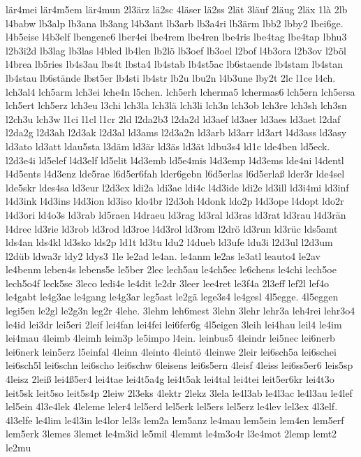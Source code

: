 {lär4mei
lär4m5em
lär4mun
2l3ärz
lä2sc
4läser
lä2ss
2lät
3läuf
2läug
2läx
1là
2lb
l4babw
lb3alp
lb3ana
lb3ang
l4b3ant
lb3arb
lb3a4ri
lb3ärm
lbb2
lbby2
lbei6ge.
l4b5eise
l4b3elf
lbengene6
lber4ei
lbe4rem
lbe4ren
lbe4ris
lbe4tag
lbe4tap
lbhu3
l2b3i2d
lb3lag
lb3las
l4bled
lb4len
lb2lö
lb3oef
lb3oel
l2bof
l4b3ora
l2b3ov
l2böl
l4brea
lb5ries
lb4s3au
lbs4t
lbsta4
lb4stab
lb4st5ac
lb6staende
lb4stam
lb4stan
lb4stau
lb6stände
lbst5er
lb4sti
lb4str
lb2u
lbu2n
l4b3une
lby2t
2lc
l1ce
l4ch.
lch3al4
lch5arm
lch3ei
lche4n
l5chen.
lch5erh
lcherma5
lchermas6
lch5ern
lch5ersa
lch5ert
lch5erz
lch3eu
l3chi
lch3la
lch3lä
lch3li
lch3n
lch3ob
lch3re
lch3sh
lch3sn
l2ch3u
lch3w
l1ci
l1cl
l1cr
2ld
l2da2b3
l2da2d
ld3aef
ld3aer
ld3aes
ld3aet
l2daf
l2da2g
l2d3ah
l2d3ak
l2d3al
ld3ams
l2d3a2n
ld3arb
ld3arr
ld3art
l4d3ass
ld3asy
ld3ato
ld3att
ldau5sta
l3däm
ld3är
ld3äs
ld3ät
ldbu3s4
ld1c
lde4ben
ld5eck.
l2d3e4i
ld5elef
l4d3elf
ld5elit
l4d3emb
ld5e4mis
l4d3emp
l4d3ems
lde4ni
l4dentl
l4d5ents
l4d3enz
lde5rae
l6d5er6fah
lder6gebn
l6d5erlas
l6d5erlaß
lder3r
lde4sel
lde5skr
ldes4sa
ld3eur
l2d3ex
ldi2a
ldi3ae
ldi4c
l4d3ide
ldi2e
ld3ill
ld3i4mi
ld3inf
l4d3ink
l4d3ins
l4d3ion
ld3iso
ldo4br
l2d3oh
l4donk
ldo2p
l4d3ope
l4dopt
ldo2r
l4d3ori
ld4o3s
ld3rab
ld5raen
l4draeu
ld3rag
ld3ral
ld3ras
ld3rat
ld3rau
l4d3rän
l4drec
ld3rie
ld3rob
ld3rod
ld3roe
l4d3rol
ld3rom
l2drö
ld3run
ld3rüc
lds5amt
lds4an
lds4kl
ld3sko
lds2p
ld1t
ld3tu
ldu2
l4dueb
ld3ufe
ldu3i
l2d3ul
l2d3um
l2düb
ldwa3r
ldy2
ldys3
1le
le2ad
le4an.
le4anm
le2as
le3atl
leauto4
le2av
le4benm
leben4s
lebens5e
le5ber
2lec
lech5au
le4ch5ec
le6chens
le4chi
lech5oe
lech5o4f
leck5se
3leco
ledi4e
le4dit
le2dr
3leer
lee4ret
le3f4a
2l3eff
lef2l
lef4o
le4gabt
le4g3ae
le4gang
le4g3ar
leg5ast
le2gä
lege3s4
le4gesl
4l5egge.
4l5eggen
legi5en
le2gl
le2g3n
leg2r
4lehe.
3lehm
leh6mest
3lehn
3lehr
lehr3a
leh4rei
lehr3o4
le4id
lei3dr
lei5eri
2leif
lei4fan
lei4fei
lei6fer6g
4l5eigen
3leih
lei4hau
leil4
le4im
lei4mau
4leimb
4leimh
leim3p
le5impo
l4ein.
leinbus5
4leindr
lei5nec
lei6nerb
lei6nerk
lein5erz
l5einfal
4leinn
4leinto
4leintö
4leinwe
2leir
lei6sch5a
lei6schei
lei6sch5l
lei6schn
lei6scho
lei6schw
6leisens
lei6s5ern
4leisf
4leiss
lei6ss5er6
leis5sp
4leisz
2leiß
lei4ß5er4
lei4tae
lei4t5a4g
lei4t5ak
lei4tal
lei4tei
leit5er6kr
lei4t3o
leit5sk
leit5so
leit5s4p
2leiw
2l3eks
4lektr
2lekz
3lela
le4l3ab
le4l3ac
le4l3au
le4lef
lel5ein
4l3e4lek
4leleme
leler4
lel5erd
lel5erk
lel5ers
lel5erz
le4lev
lel3ex
4l3elf.
4l3elfe
le4lim
le4l3in
le4lor
lel3s
lem2a
lem5anz
le4mau
lem5ein
lem4en
lem5erf
lem5erk
3lemes
3lemet
le4m3id
le5mil
4lemmt
le4m3o4r
l3e4mot
2lemp
lemt2
le2mu
}
